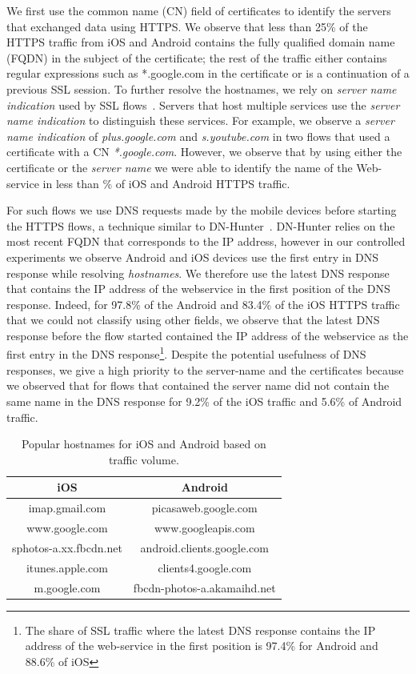 We first use the common name (CN) field of certificates to identify the servers that exchanged data using HTTPS.
We observe that less than 25\% of the HTTPS traffic from iOS and Android contains the fully qualified domain name (FQDN) in the subject of the certificate; the rest of the traffic either contains regular expressions such as *.google.com in the certificate or is a continuation of a previous SSL session. 
To further resolve the hostnames, we rely on \emph{server name indication} used by SSL flows~\cite{rfc:servernametls}.
Servers that host multiple services use the \emph{server name indication} to distinguish these services.   
For example, we observe a \emph{server name indication} of \emph{plus.google.com} and \emph{s.youtube.com} in two flows that used a certificate with a CN \emph{*.google.com}.
However, we observe that by using either the certificate or the \emph{server name} we were able to identify the name of the Web-service in less than \% of iOS and Android HTTPS traffic.

For such flows we use DNS requests made by the mobile devices before starting the HTTPS flows, a technique similar to DN-Hunter~\cite{bermudez:dnhunter}.
DN-Hunter relies on the most recent FQDN that corresponds to the IP address, however in our controlled experiments we observe Android and iOS devices use the first entry in DNS response while resolving \emph{hostnames}.
We therefore use the latest DNS response that contains the IP address of the webservice in the first position of the DNS response. 
Indeed, for 97.8\% of the Android and 83.4\% of the iOS HTTPS traffic that we could not classify using other fields, we observe that the latest DNS response before the flow started contained the IP address of the webservice as the first entry in the DNS response\footnote{The share of SSL traffic where the latest DNS response contains the IP address of the web-service in the first position is 97.4\% for Android and 88.6\% of iOS}. 
Despite the potential usefulness of DNS responses, we give a high priority to the server-name and the certificates because we observed that for flows that contained the server name did not contain the same name in the DNS response for 9.2\% of the iOS traffic and 5.6\% of Android traffic.

\begin{table}
\centering
\begin{small}
\begin{tabular}{|c|c|}
\hline
{\bf iOS} & {\bf Android} \tabularnewline
\hline
imap.gmail.com & picasaweb.google.com \tabularnewline
www.google.com & www.googleapis.com \tabularnewline
sphotos-a.xx.fbcdn.net & android.clients.google.com \tabularnewline
itunes.apple.com  & clients4.google.com \tabularnewline
m.google.com & fbcdn-photos-a.akamaihd.net \tabularnewline
\hline
\end{tabular}
\end{small}
\caption{Popular hostnames for iOS and Android based on traffic volume.}
\label{tab:sslclassify-popular-host}
\end{table}

